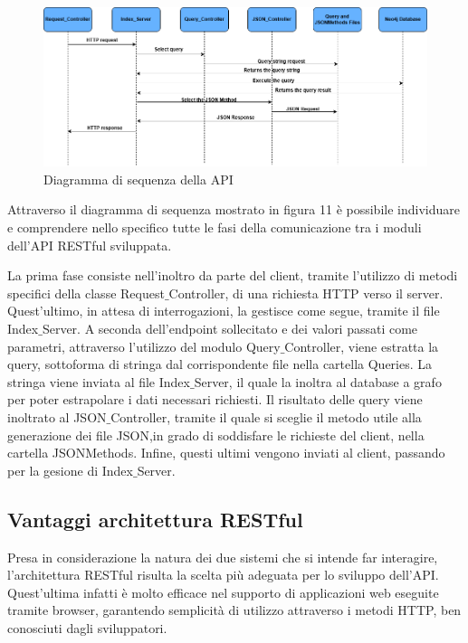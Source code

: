 \newpage
\thispagestyle{mystyle}
\begin{figure}[H]
    \centering \includegraphics[keepaspectratio=true,scale=0.45]{Images/FlowChartAPI.png}
    \caption{Diagramma di sequenza della API}
\end{figure}

Attraverso il diagramma di sequenza mostrato in figura 11 è possibile individuare e comprendere nello specifico tutte le fasi della comunicazione tra i moduli dell'API RESTful sviluppata.

La prima fase consiste nell'inoltro da parte del client, tramite l'utilizzo di metodi specifici della classe Request$\_$Controller, di una richiesta HTTP verso il server.
Quest'ultimo, in attesa di interrogazioni, la gestisce come segue, tramite il file Index$\_$Server. A seconda dell'endpoint sollecitato e dei valori passati come parametri, attraverso l'utilizzo del modulo  Query$\_$Controller, viene estratta la query, sottoforma di stringa dal corrispondente file nella cartella Queries.
La stringa viene inviata al file Index$\_$Server, il quale la inoltra al database a grafo per poter estrapolare i dati necessari richiesti.
Il risultato delle query viene inoltrato al JSON$\_$Controller, tramite il quale si sceglie il metodo utile alla generazione dei file JSON,in grado di soddisfare le richieste del client, nella cartella JSONMethods.
Infine, questi ultimi vengono inviati al client, passando per la gesione di Index$\_$Server.

\subsection{Vantaggi architettura RESTful}

Presa in considerazione la natura dei due sistemi che si intende far interagire, l'architettura RESTful risulta la scelta più adeguata per lo sviluppo dell'API.
Quest'ultima infatti è molto efficace nel supporto di applicazioni web eseguite tramite browser, garantendo semplicità di utilizzo attraverso i metodi HTTP, ben conosciuti dagli sviluppatori. 

